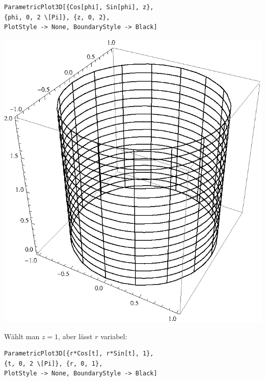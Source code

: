 \documentclass[10pt,a4paper]{scrartcl}
\begin{document}
\begin{enumerate}[(i)]
\begin{minipage}{0.49\columnwidth}
\begin{lstlisting}[caption= Mathematica Code für den Graph von Z]
ParametricPlot3D[{Cos[phi], Sin[phi], z}, 
{phi, 0, 2 \[Pi]}, {z, 0, 2}, 
PlotStyle -> None, BoundaryStyle -> Black]
\end{lstlisting}
\end{minipage}
\begin{minipage}{0.50\columnwidth}
\begin{center}
\includegraphics[scale=0.7]{1iv.eps} 
\end{center}
\end{minipage}
\begin{minipage}{0.50\columnwidth}
Wählt man $z = 1$, aber lässt $r$ variabel:
\begin{lstlisting}[caption= Mathematica Code für den Graph von Z]
ParametricPlot3D[{r*Cos[t], r*Sin[t], 1}, 
{t, 0, 2 \[Pi]}, {r, 0, 1}, 
PlotStyle -> None, BoundaryStyle -> Black]
\end{lstlisting}
\end{minipage}
\begin{minipage}{0.50\columnwidth}
\begin{center}

\end{center}
\end{minipage}
\end{enumerate}
\end{document}
